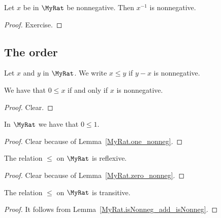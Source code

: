 \begin{lemma}
    \label{MyRat.isNonneg_inv_isNonneg}
    \leanok
    Let $x$ be in $\MyRat$ be nonnegative. Then $x^{-1}$ is nonnegative.
\end{lemma}
\begin{proof}
    \leanok
    Exercise.
\end{proof}

\subsection{The order}

\begin{definition}
    \label{MyRat.le}
    \leanok
Let $x$ and $y$ in $\MyRat$. We write $x \leq y$ if $y - x$ is nonnegative.
\end{definition}

\begin{lemma}
    \label{MyRat.zero_le_iff_IsNonneg}
    \leanok
    We have that $0 \leq x$ if and only if $x$ is nonnegative.
\end{lemma}
\begin{proof}
    \leanok
    Clear.
\end{proof}

\begin{lemma}
    \label{MyRat.zero_le_one}
    \leanok
    In $\MyRat$ we have that $0 \leq 1$.
\end{lemma}
\begin{proof}
    \leanok
    Clear because of Lemma~\ref{MyRat.one_nonneg}.
\end{proof}

\begin{lemma}
    \label{MyRat.le_refl}
    \leanok
    The relation $\leq$ on $\MyRat$ is reflexive.
\end{lemma}
\begin{proof}
    \leanok
    Clear because of Lemma~\ref{MyRat.zero_nonneg}.
\end{proof}

\begin{lemma}
    \label{MyRat.le_trans}
    \leanok
    The relation $\leq$ on $\MyRat$ is transitive.
\end{lemma}
\begin{proof}
    \leanok
 It follows from Lemma~\ref{MyRat.isNonneg_add_isNonneg}.
\end{proof}

